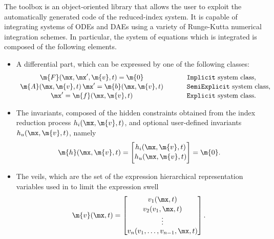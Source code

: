 The \Indigo{} \Matlab{} toolbox is an object-oriented library that allows the user to exploit the automatically generated code of the reduced-index system. It is capable of integrating systems of \acp{ODE} and \acp{DAE} using a variety of Runge-Kutta numerical integration schemes. In particular, the system of equations which is integrated is composed of the following elements.
%
\begin{itemize}
  \setlength{\itemsep}{0pt}
    \item A differential part, which can be expressed by one of the following classes:
    \begin{equation}
        \begin{array}{ccl}
            \m{F}(\mx, \mx^\prime, \m{v}, t) = \m{0} & \hspace{0.5cm} &
            \text{\texttt{Implicit} system class,} \\[0.5mm]
            \m{A}(\mx, \m{v}, t) \, \mx^\prime = \m{b}(\mx, \m{v}, t) & \hspace{0.5cm} &
            \text{\texttt{SemiExplicit} system class,} \\[0.5mm]
            \mx^\prime = \m{f}(\mx, \m{v}, t) & \hspace{0.5cm} &
            \text{\texttt{Explicit} system class.}
        \end{array}
    \end{equation}
    \item The invariants, composed of the hidden constraints obtained from the index reduction process $h_{i}(\mx, \m{v}, t)$, and optional user-defined invariants $h_{u}(\mx, \m{v}, t)$, namely
    \begin{equation}
        \label{chap3:eq:inv_part}
        \m{h}(\mx, \m{v}, t) = \begin{bmatrix}
            h_{i}(\mx, \m{v}, t) \\[0.5mm]
            h_{u}(\mx, \m{v}, t) \\[0.5mm]
        \end{bmatrix} = \m{0} \text{.}
    \end{equation}
    \item The veils, which are the set of the expression hierarchical representation variables used in \LEM{} to limit the expression swell
    \begin{equation}
        \m{v}(\mx, t) = \begin{bmatrix}
            v_{1}(\mx, t) \\[0.5mm]
            v_{2}(v_{1}, \mx, t) \\
            \vdots \\
            v_{n}(v_{1}, \dots, v_{n-1}, \mx, t)
        \end{bmatrix} \text{.}
    \end{equation}
\end{itemize}

